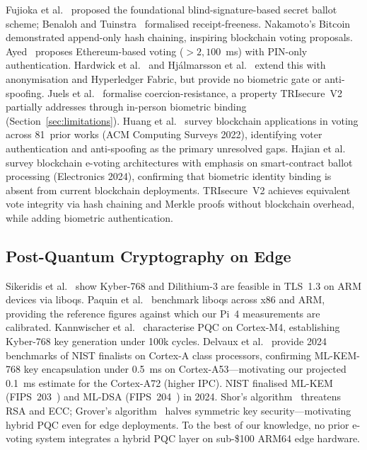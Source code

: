\documentclass[conference]{IEEEtran}
\begin{document}
Fujioka et al.~\cite{fujioka1992practical} proposed the foundational
blind-signature-based secret ballot scheme; Benaloh and
Tuinstra~\cite{benaloh1994receipt} formalised receipt-freeness.
Nakamoto's Bitcoin~\cite{nakamoto2008bitcoin} demonstrated append-only hash
chaining, inspiring blockchain voting proposals.
Ayed~\cite{ayed2017conceptual} proposes Ethereum-based voting
(\(>2{,}100\)~ms) with PIN-only authentication.
Hardwick et al.~\cite{hardwick2018voting} and Hj\'{a}lmarsson et
al.~\cite{hjalmarsson2018blockchain} extend this with anonymisation and
Hyperledger Fabric, but provide no biometric gate or anti-spoofing.
Juels et al.~\cite{juels2010coercion} formalise coercion-resistance,
a property TRIsecure~V2 partially addresses through in-person biometric
binding (Section~\ref{sec:limitations}).
Huang et al.~\cite{huang2022blockchain_voting} survey blockchain applications
in voting across 81~prior works (ACM Computing Surveys 2022), identifying
voter authentication and anti-spoofing as the primary unresolved gaps.
Hajian et al.~\cite{hajian2024blockchain} survey blockchain e-voting
architectures with emphasis on smart-contract ballot processing
(Electronics 2024), confirming that biometric identity binding is absent
from current blockchain deployments.
TRIsecure~V2 achieves equivalent vote integrity via hash chaining and Merkle
proofs without blockchain overhead, while adding biometric authentication.

\subsection{Post-Quantum Cryptography on Edge}

Sikeridis et al.~\cite{sikeridis2020pqc} show Kyber-768 and Dilithium-3 are
feasible in TLS~1.3 on ARM devices via liboqs.
Paquin et al.~\cite{paquin2019oqs} benchmark liboqs across x86 and ARM,
providing the reference figures against which our Pi~4 measurements are
calibrated. Kannwischer et al.~\cite{kannwischer2019pqm4} characterise PQC
on Cortex-M4, establishing Kyber-768 key generation under 100k cycles.
Delvaux et al.~\cite{delvaux2024pqc_iot} provide 2024 benchmarks of NIST
finalists on Cortex-A class processors, confirming ML-KEM-768 key
encapsulation under 0.5~ms on Cortex-A53—motivating our projected 0.1~ms
estimate for the Cortex-A72 (higher IPC).
NIST finalised ML-KEM (FIPS~203~\cite{nist_fips203}) and ML-DSA
(FIPS~204~\cite{nist_fips204}) in 2024. Shor's algorithm~\cite{shor1994algorithms}
threatens RSA and ECC; Grover's algorithm~\cite{grover1996fast} halves symmetric
key security—motivating hybrid PQC even for edge deployments. To the best of our knowledge, no prior e-voting system integrates a
hybrid PQC layer on sub-\$100 ARM64 edge hardware.
\end{document}
